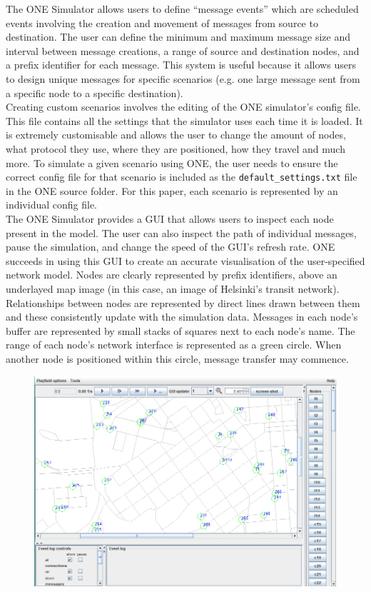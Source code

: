 \documentclass{article}
\begin{document}
\noindent The ONE Simulator allows users to define ``message events'' which are scheduled events involving the creation and movement of messages from source to destination. The user can define the minimum and maximum message size and interval between message creations, a range of source and destination nodes, and a prefix identifier for each message. This system is useful because it allows users to design unique messages for specific scenarios (e.g. one large message sent from a specific node to a specific destination).\\
\newline Creating custom scenarios involves the editing of the ONE simulator's config file. This file contains all the settings that the simulator uses each time it is loaded. It is extremely customisable and allows the user to change the amount of nodes, what protocol they use, where they are positioned, how they travel and much more. To simulate a given scenario using ONE, the user needs to ensure the correct config file for that scenario is included as the \texttt{default\_settings.txt} file in the ONE source folder. For this paper, each scenario is represented by an individual config file.\\
\newline The ONE Simulator provides a GUI that allows users to inspect each node present in the model. The user can also inspect the path of individual messages, pause the simulation, and change the speed of the GUI's refresh rate. ONE succeeds in using this GUI to create an accurate visualisation of the user-specified network model. Nodes are clearly represented by prefix identifiers, above an underlayed map image (in this case, an image of Helsinki's transit network). Relationships between nodes are represented by direct lines drawn between them and these consistently update with the simulation data. Messages in each node's buffer are represented by small stacks of squares next to each node's name. The range of each node's network interface is represented as a green circle. When another node is positioned within this circle, message transfer may commence.\\

\begin{figure}[h!]
\captionsetup{justification=centering, font=footnotesize}
\centering
  \includegraphics[width=.6\linewidth]{Screenshots/ONEGUI.png}
  \label{fig:test1}
\end{figure}
\end{document}
